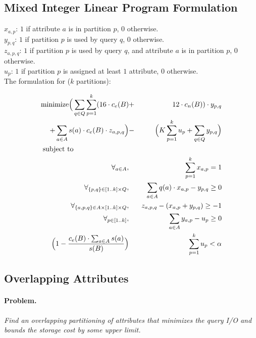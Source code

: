 \documentclass[twocolumn]{svjour3}          %
\begin{document}
\subsection{Mixed Integer Linear Program Formulation}
$x_{a,p}$: $1$ if attribute $a$ is in partition $p$, $0$ otherwise.\\
$y_{p,q}$: $1$ if partition $p$ is used by query $q$, $0$ otherwise.\\
$z_{a,p,q}$: $1$ if partition $p$ is used by query $q$, and attribute $a$ is in partition $p$, $0$ otherwise.\\
$u_{p}$: $1$ if partition $p$ is assigned at least $1$ attribute, $0$ otherwise.\\
The formulation for ($k$ partitions):

\begin{eqnarray}
\text{minimize} 
    \Big(\sum_{q\in Q} \sum_{p=1}^{k} (16\cdot c_e(B) &+& 12\cdot c_n(B))\cdot y_{p,q}\nonumber\\
    + \sum_{a\in A} s(a)\cdot c_e(B)\cdot z_{a,p,q}\Big) &-& \Big(K \sum_{p=1}^{k} u_p + \sum_{q\in Q} y_{p,q}\Big) \nonumber\\
\text{subject to}\hspace{2.75cm}&&\nonumber\\
\forall_{a\in A}, 
    && \sum_{p=1}^{k} x_{a,p} = 1\nonumber\\
\forall_{\{p,q\}\in [1..k]\times Q}, 
    &&  \sum_{a\in A} q(a)\cdot x_{a,p} - y_{p,q} \geq 0 \nonumber\\
\forall_{\{a,p,q\}\in A\times [1..k]\times Q},
  && z_{a,p,q} - (x_{a,p} + y_{p,q}) \geq -1\nonumber\\
\forall_{p\in[1..k]},
   && \sum_{a\in A} y_{a,p} - u_p \geq 0 \nonumber\\
\Big(1-\frac{c_e(B)\cdot \sum_{a\in A} s(a)}{s(B)}\Big) && \sum_{p=1}^{k} u_p < \alpha \nonumber
\end{eqnarray}



\subsection{Overlapping Attributes}

\paragraph*{Problem.}\emph{Find an overlapping partitioning of attributes that minimizes
  the query I/O and bounds the storage cost by some upper limit.}
\end{document}
